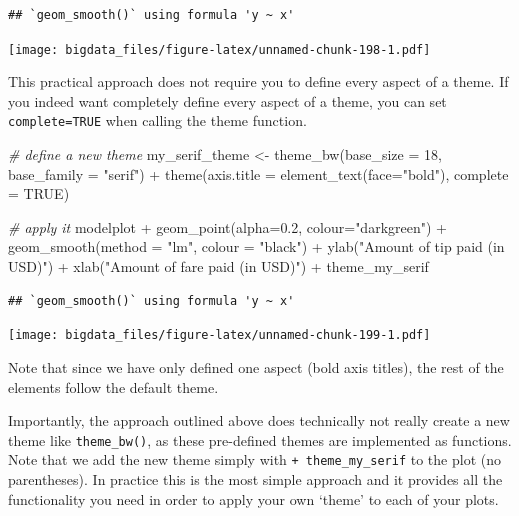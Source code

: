 \documentclass[
  12pt,
]{style/krantz}
\newenvironment{Shaded}{\begin{snugshade}}{\end{snugshade}}
\newcommand{\AttributeTok}[1]{\textcolor[rgb]{0.77,0.63,0.00}{#1}}
\newcommand{\CommentTok}[1]{\textcolor[rgb]{0.56,0.35,0.01}{\textit{#1}}}
\newcommand{\ConstantTok}[1]{\textcolor[rgb]{0.00,0.00,0.00}{#1}}
\newcommand{\DecValTok}[1]{\textcolor[rgb]{0.00,0.00,0.81}{#1}}
\newcommand{\FloatTok}[1]{\textcolor[rgb]{0.00,0.00,0.81}{#1}}
\newcommand{\FunctionTok}[1]{\textcolor[rgb]{0.00,0.00,0.00}{#1}}
\newcommand{\NormalTok}[1]{#1}
\newcommand{\OtherTok}[1]{\textcolor[rgb]{0.56,0.35,0.01}{#1}}
\newcommand{\SpecialCharTok}[1]{\textcolor[rgb]{0.00,0.00,0.00}{#1}}
\newcommand{\StringTok}[1]{\textcolor[rgb]{0.31,0.60,0.02}{#1}}
\begin{document}
\begin{verbatim}
## `geom_smooth()` using formula 'y ~ x'
\end{verbatim}

\texttt{[image: bigdata\_files/figure-latex/unnamed-chunk-198-1.pdf]}

This practical approach does not require you to define every aspect of a theme. If you indeed want completely define every aspect of a theme, you can set \texttt{complete=TRUE} when calling the theme function.

\begin{Shaded}
\begin{Highlighting}[]
\CommentTok{\# \textquotesingle{}define\textquotesingle{} a new theme}
\NormalTok{my\_serif\_theme }\OtherTok{\textless{}{-}}      
  \FunctionTok{theme\_bw}\NormalTok{(}\AttributeTok{base\_size =} \DecValTok{18}\NormalTok{, }\AttributeTok{base\_family =} \StringTok{"serif"}\NormalTok{) }\SpecialCharTok{+}
  \FunctionTok{theme}\NormalTok{(}\AttributeTok{axis.title =} \FunctionTok{element\_text}\NormalTok{(}\AttributeTok{face=}\StringTok{"bold"}\NormalTok{), }\AttributeTok{complete =} \ConstantTok{TRUE}\NormalTok{)}

\CommentTok{\# apply it }
\NormalTok{modelplot }\SpecialCharTok{+}
     \FunctionTok{geom\_point}\NormalTok{(}\AttributeTok{alpha=}\FloatTok{0.2}\NormalTok{, }\AttributeTok{colour=}\StringTok{"darkgreen"}\NormalTok{) }\SpecialCharTok{+}
     \FunctionTok{geom\_smooth}\NormalTok{(}\AttributeTok{method =} \StringTok{"lm"}\NormalTok{, }\AttributeTok{colour =} \StringTok{"black"}\NormalTok{) }\SpecialCharTok{+}
     \FunctionTok{ylab}\NormalTok{(}\StringTok{"Amount of tip paid (in USD)"}\NormalTok{) }\SpecialCharTok{+}
     \FunctionTok{xlab}\NormalTok{(}\StringTok{"Amount of fare paid (in USD)"}\NormalTok{) }\SpecialCharTok{+}
\NormalTok{  theme\_my\_serif}
\end{Highlighting}
\end{Shaded}

\begin{verbatim}
## `geom_smooth()` using formula 'y ~ x'
\end{verbatim}

\texttt{[image: bigdata\_files/figure-latex/unnamed-chunk-199-1.pdf]}

Note that since we have only defined one aspect (bold axis titles), the rest of the elements follow the default theme.

Importantly, the approach outlined above does technically not really create a new theme like \texttt{theme\_bw()}, as these pre-defined themes are implemented as functions. Note that we add the new theme simply with \texttt{+\ theme\_my\_serif} to the plot (no parentheses). In practice this is the most simple approach and it provides all the functionality you need in order to apply your own `theme' to each of your plots.
\end{document}
